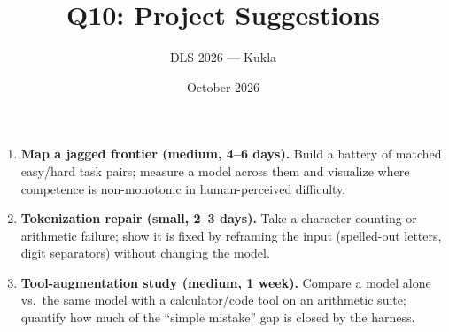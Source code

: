 \documentclass[11pt]{article}
\title{Q10: Project Suggestions}
\author{DLS 2026 --- Kukla}
\date{October 2026}
\begin{document}
\maketitle
\begin{enumerate}[leftmargin=1.5em]
\item \textbf{Map a jagged frontier (medium, 4--6 days).} Build a battery of matched easy/hard task pairs; measure a model across them and visualize where competence is non-monotonic in human-perceived difficulty.
\item \textbf{Tokenization repair (small, 2--3 days).} Take a character-counting or arithmetic failure; show it is fixed by reframing the input (spelled-out letters, digit separators) without changing the model.
\item \textbf{Tool-augmentation study (medium, 1 week).} Compare a model alone vs.\ the same model with a calculator/code tool on an arithmetic suite; quantify how much of the ``simple mistake'' gap is closed by the harness.
\end{enumerate}
\end{document}
